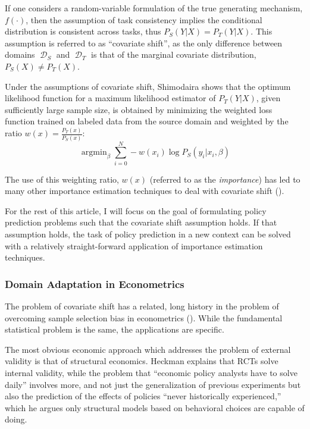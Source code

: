 \documentclass[a4paper,12pt]{article}
\DeclareMathOperator*{\argmin}{argmin}
\DeclareMathOperator*{\D}{\mathcal{D}}
\begin{document}
If one considers a random-variable formulation of the true generating mechanism, $f(\cdot)$, then the assumption of task consistency implies the conditional distribution is consistent across tasks, thus $P_S(Y | X) = P_T(Y | X)$. This assumption is referred to as ``covariate shift'', as the only difference between domains $\D_S$ and $\D_T$ is that of the marginal covariate distribution, $P_S(X) \neq P_T(X)$.

Under the assumptions of covariate shift, Shimodaira \parencite*{Shimodaira2000} shows that the optimum likelihood function for a maximum likelihood estimator of $P_T(Y | X)$, given sufficiently large sample size, is obtained by minimizing the weighted loss function trained on labeled data from the source domain and weighted by the ratio $w(x) = \frac{P_T(x)}{P_S(x)}$:
%
$$
\argmin_{\beta} \sum_{i=0}^N -w(x_i) \log P_S(y_i | x_i, \beta)
$$

The use of this weighting ratio, $w(x)$ (referred to as the \textit{importance}) has led to many other importance estimation techniques to deal with covariate shift (\cite{Suigyama2007, Pan2010}).

For the rest of this article, I will focus on the goal of formulating policy prediction problems such that the covariate shift assumption holds. If that assumption holds, the task of policy prediction in a new context can be solved with a relatively straight-forward application of importance estimation techniques.

\subsubsection{Domain Adaptation in Econometrics}

The problem of covariate shift has a related, long history in the problem of overcoming sample selection bias in econometrics (\cite{Manski1977}). While the fundamental statistical problem is the same, the applications are specific.

The most obvious economic approach which addresses the problem of external validity is that of structural economics. Heckman \parencite*{Heckman2008} explains that RCTs solve internal validity, while the problem that ``economic policy analysts have to solve daily'' involves more, and not just the generalization of previous experiments but also the prediction of the effects of policies ``never historically experienced,'' which he argues only structural models based on behavioral choices are capable of doing.
\end{document}
